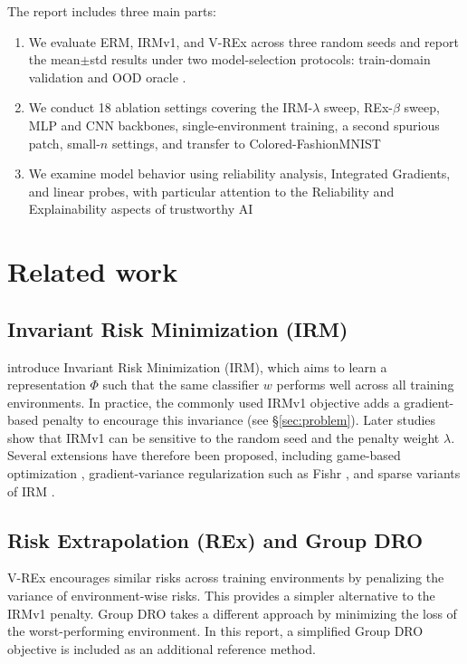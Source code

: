 \documentclass[12pt,a4paper]{article}
\begin{document}
The report includes three main parts:
\begin{enumerate}
\item We evaluate ERM, IRMv1, and V-REx across three random seeds and report the mean$\pm$std 
results under two model-selection protocols: train-domain validation and OOD oracle 
\citep{domainbed2021}.
\item We conduct 18 ablation settings covering the IRM-$\lambda$ sweep, REx-$\beta$ 
sweep, MLP and CNN backbones, single-environment training, a second spurious patch, 
small-$n$ settings, and transfer to Colored-FashionMNIST\@
\item We examine model behavior using reliability analysis, Integrated Gradients, 
and linear probes, with particular attention to the Reliability and Explainability 
aspects of trustworthy AI\@
\end{enumerate}
\clearpage
\section{Related work}\label{sec:related}

\subsection{Invariant Risk Minimization (IRM)}
\citet{arjovsky2019irm} introduce Invariant Risk Minimization (IRM), which aims to learn a 
representation $\Phi$ such that the same classifier $w$ performs well across all training environments. 
In practice, the commonly used IRMv1 objective adds a gradient-based penalty to 
encourage this invariance (see \S\ref{sec:problem}). Later studies show that IRMv1 
can be sensitive to the random seed and the penalty weight $\lambda$. 
Several extensions have therefore been proposed, including game-based 
optimization \citep{irmgames2020}, gradient-variance regularization such as 
Fishr \citep{rame2022fishr}, and sparse variants of IRM \citep{zhou2022sparseirm}.

\subsection{Risk Extrapolation (REx) and Group DRO}
V-REx \citep{krueger2021rex} encourages similar risks across training environments 
by penalizing the variance of environment-wise risks. This provides a simpler 
alternative to the IRMv1 penalty. Group DRO \citep{sagawa2020dro} takes a 
different approach by minimizing the loss of the worst-performing environment. 
In this report, a simplified Group DRO objective is included as an additional 
reference method.
\end{document}
